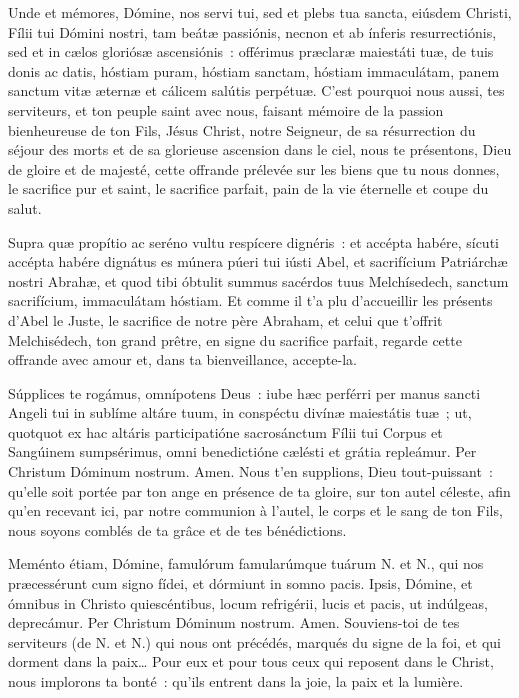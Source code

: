\begin{paracol}{2}

\LigneParacol{0cm}
{Unde et mémores, Dómine, nos servi tui, sed et plebs tua sancta, eiúsdem Christi, Fílii tui Dómini nostri, tam beátæ passiónis, necnon et ab ínferis resurrectiónis, sed et in cælos gloriósæ ascensiónis~: offérimus præclaræ maiestáti tuæ, de tuis donis ac datis, hóstiam puram, hóstiam sanctam, hóstiam immaculátam, panem sanctum vitæ æternæ et cálicem salútis perpétuæ.}
{C'est pourquoi nous aussi, tes serviteurs, et ton peuple saint avec nous, faisant mémoire de la passion bienheureuse de ton Fils, Jésus Christ, notre Seigneur, de sa résurrection du séjour des morts et de sa glorieuse ascension dans le ciel, nous te présentons, Dieu de gloire et de majesté, cette offrande prélevée sur les biens que tu nous donnes, le sacrifice pur et saint, le sacrifice parfait, pain de la vie éternelle et coupe du salut.}

\LigneParacol{0cm}
{Supra quæ propítio ac seréno vultu respícere dignéris~: et accépta habére, sícuti accépta habére dignátus es múnera púeri tui iústi Abel, et sacrifícium Patriárchæ nostri Abrahæ, et quod tibi óbtulit summus sacérdos tuus Melchísedech, sanctum sacrifícium, immaculátam hóstiam.}
{Et comme il t'a plu d'accueillir les présents d'Abel le Juste, le sacrifice de notre père Abraham, et celui que t'offrit Melchisédech, ton grand prêtre, en signe du sacrifice parfait, regarde cette offrande avec amour et, dans ta bienveillance, accepte-la.}

\LigneParacol{0cm}
{Súpplices te rogámus, omnípotens De\-us~: iube hæc perférri per manus sancti Angeli tui in sublíme altáre tuum, in conspéctu divínæ maiestátis tuæ~; ut, quotquot ex hac altáris participatióne sacrosánctum Fílii tui Corpus et Sangúinem sumpsérimus, omni benedictióne cælésti et grátia repleámur. Per Christum Dóminum nostrum. Amen.}
{Nous t'en supplions, Dieu tout-puis\-sant~: qu'elle soit portée par ton ange en présence de ta gloire, sur ton autel céleste, afin qu'en recevant ici, par notre communion à l'autel, le corps et le sang de ton Fils, nous soyons comblés de ta grâce et de tes bénédictions.}

\LigneParacol{0cm}
{Meménto étiam, Dómine, famulórum famularúmque tuárum {\color{rougeliturgique}N.} et {\color{rougeliturgique}N.}, qui nos præcessérunt cum signo fídei, et dórmiunt in somno pacis. Ipsis, Dómine, et ómnibus in Christo quiescéntibus, locum refrigérii, lucis et pacis, ut indúlgeas, deprecámur. Per Christum Dóminum nostrum. Amen.}
{Souviens-toi de tes serviteurs (de {\color{rougeliturgique}N.} et {\color{rougeliturgique}N.}) qui nous ont précédés, marqués du signe de la foi, et qui dorment dans la paix… Pour eux et pour tous ceux qui reposent dans le Christ, nous implorons ta bonté~: qu'ils entrent dans la joie, la paix et la lumière.}


\end{paracol}
